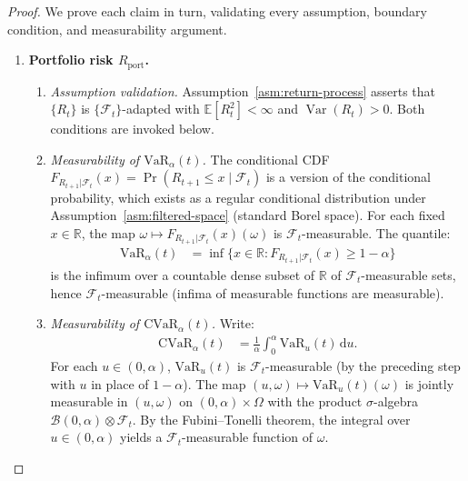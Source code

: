 \documentclass[12pt,openany]{book}
\newcommand{\calF}{\mathcal{F}}
\newcommand{\E}{\mathbb{E}}
\numberwithin{equation}{chapter}
\theoremstyle{plain}
\theoremstyle{definition}
\theoremstyle{remark}
\numberwithin{equation}{chapter}
\theoremstyle{plain}
\DeclareMathOperator{\Var}{Var}
\begin{document}
\begin{proof}
We prove each claim in turn, validating every assumption,
boundary condition, and measurability argument.

\begin{enumerate}

  \item \textbf{Portfolio risk $R_{\mathrm{port}}$.}

    \begin{enumerate}
      \item \emph{Assumption validation.}
        Assumption~\ref{asm:return-process} asserts that
        $\{R_t\}$ is $\{\calF_t\}$-adapted with
        $\E[R_t^2] < \infty$ and $\Var(R_t) > 0$.
        Both conditions are invoked below.

      \item \emph{Measurability of $\mathrm{VaR}_\alpha(t)$.}
        The conditional CDF
        $F_{R_{t+1}|\calF_t}(x) = \Pr(R_{t+1} \leq x \mid \calF_t)$
        is a version of the conditional probability, which exists
        as a regular conditional distribution under
        Assumption~\ref{asm:filtered-space} (standard Borel space).
        For each fixed $x \in \mathbb{R}$, the map
        $\omega \mapsto F_{R_{t+1}|\calF_t}(x)(\omega)$ is
        $\calF_t$-measurable.
        The quantile:
        \begin{align}
          \mathrm{VaR}_\alpha(t)
            &= \inf\bigl\{x \in \mathbb{R} :
               F_{R_{t+1}|\calF_t}(x) \geq 1 - \alpha\bigr\}
        \end{align}
        is the infimum over a countable dense subset of
        $\mathbb{R}$ of $\calF_t$-measurable sets, hence
        $\calF_t$-measurable (infima of measurable functions are
        measurable).

      \item \emph{Measurability of $\mathrm{CVaR}_\alpha(t)$.}
        Write:
        \begin{align}
          \mathrm{CVaR}_\alpha(t)
            &= \frac{1}{\alpha}
               \int_0^{\alpha}
                 \mathrm{VaR}_u(t)\, \mathrm{d}u.
        \end{align}
        For each $u \in (0,\alpha)$, $\mathrm{VaR}_u(t)$ is
        $\calF_t$-measurable (by the preceding step with $u$ in
        place of $1-\alpha$).
        The map $(u,\omega) \mapsto \mathrm{VaR}_u(t)(\omega)$ is
        jointly measurable in $(u, \omega)$ on
        $(0,\alpha) \times \Omega$ with the product
        $\sigma$-algebra $\mathcal{B}(0,\alpha) \otimes \calF_t$.
        By the Fubini--Tonelli theorem, the integral over
        $u \in (0,\alpha)$ yields a $\calF_t$-measurable function
        of $\omega$.


\end{enumerate}
\end{enumerate}
\end{proof}
\end{document}
